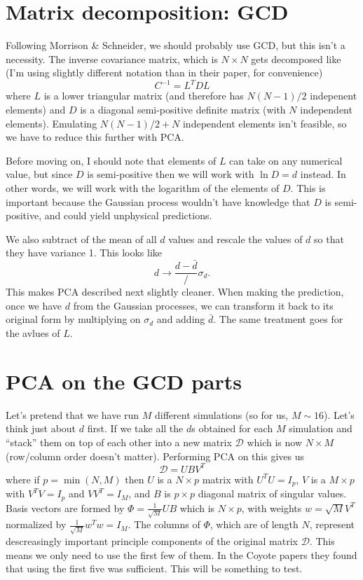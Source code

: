 \documentclass[11pt,twoside,a5paper]{article}
\newcommand{\dc}{\mathcal{D} }
\begin{document}
\section{Matrix decomposition: GCD}
Following Morrison \& Schneider, we should probably use GCD, but this isn't a necessity. The inverse covariance matrix, which is $N\times N$ gets decomposed like (I'm using slightly different notation than in their paper, for convenience)
\begin{equation}
  \label{eq:gcd}
  C^{-1} = L^TDL
\end{equation}
where $L$ is a lower triangular matrix (and therefore has $N(N-1)/2$ indepenent elements) and $D$ is a diagonal semi-positive definite matrix (with $N$ independent elements). Emulating $N(N-1)/2+N$ independent elements isn't feasible, so we have to reduce this further with PCA.

Before moving on, I should note that elements of $L$ can take on any numerical value, but since $D$ is semi-positive then we will work with $\ln D = d$ instead. In other words, we will work with the logarithm of the elements of $D$. This is important because the Gaussian process wouldn't have knowledge that $D$ is semi-positive, and could yield unphysical predictions.

We also subtract of the mean of all $d$ values and rescale the values of $d$ so that they have variance 1. This looks like
\begin{equation}
  \label{eq:rescale}
  d \rightarrow \frac{d - \bar{d}}/\sigma_d.
\end{equation}
This makes PCA described next slightly cleaner. When making the prediction, once we have $d$ from the Gaussian processes, we can transform it back to its original form by multiplying on $\sigma_d$ and adding $\bar{d}$. The same treatment goes for the avlues of $L$.

\section{PCA on the GCD parts}
Let's pretend that we have run $M$ different simulations (so for us, $M\sim16$). Let's think just about $d$ first. If we take all the $d$s obtained for each $M$ simulation and ``stack'' them on top of each other into a new matrix $\dc$ which is now $N\times M$ (row/column order doesn't matter). Performing PCA on this gives us
\begin{equation}
  \label{eq:PCA}
  \dc = UBV^T
\end{equation}
where if $p=\min(N,M)$ then $U$ is a $N\times p$ matrix with $U^TU=I_p$, $V$ is a $M\times p$ with $V^TV=I_p$ and $VV^T=I_M$, and $B$ is $p\times p$ diagonal matrix of singular values. Basis vectors are formed by $\Phi = \frac{1}{\sqrt{M}}UB$ which is $N\times p$, with weights $w=\sqrt{M}V^T$ normalized by $\frac{1}{\sqrt{M}}w^Tw=I_M$. The columns of $\Phi$, which are of length $N$, represent descreasingly important principle components of the original matrix $\dc$. This means we only need to use the first few of them. In the Coyote papers they found that using the first five was sufficient. This will be something to test.
\end{document}
